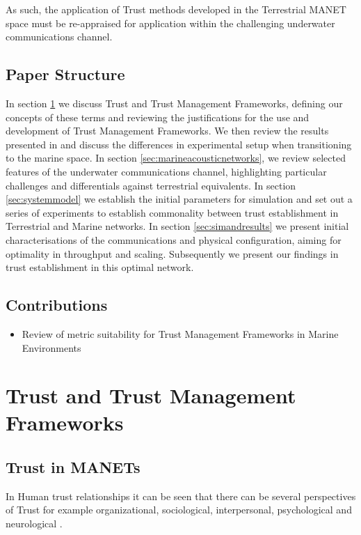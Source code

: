 \documentclass[runningheads,a4paper]{llncs}
\begin{document}
As such, the application of Trust methods developed in the Terrestrial MANET space must be re-appraised for application within the challenging underwater communications channel.

\subsection{Paper Structure}

In section \ref{sec:trustandtmfs} we discuss Trust and Trust Management Frameworks, defining our concepts of these terms and reviewing the justifications for the use and development of Trust Management Frameworks. We then review the results presented in \cite{Guo11} and discuss the differences in experimental setup when transitioning to the marine space.
In section \ref{sec:marineacousticnetworks}, we review selected features of the underwater communications channel, highlighting particular challenges and differentials against terrestrial equivalents. 
In section \ref{sec:systemmodel} we establish the initial parameters for simulation and set out a series of experiments to establish commonality between trust establishment in Terrestrial and Marine networks.
In section \ref{sec:simandresults} we present initial characterisations of the communications and physical configuration, aiming for optimality in throughput and scaling. Subsequently we present our findings in trust establishment in this optimal network.

\subsection{Contributions}
\begin{itemize}
  \item Review of metric suitability for Trust Management Frameworks in Marine Environments
\end{itemize}

\section{Trust and Trust Management Frameworks}\label{sec:trustandtmfs}

\subsection{Trust in MANETs}\label{sec:trustinmanets}

In Human trust relationships it can be seen that there can be several perspectives of Trust for example organizational, sociological, interpersonal, psychological and neurological \cite{Lee2004}. 
\end{document}
